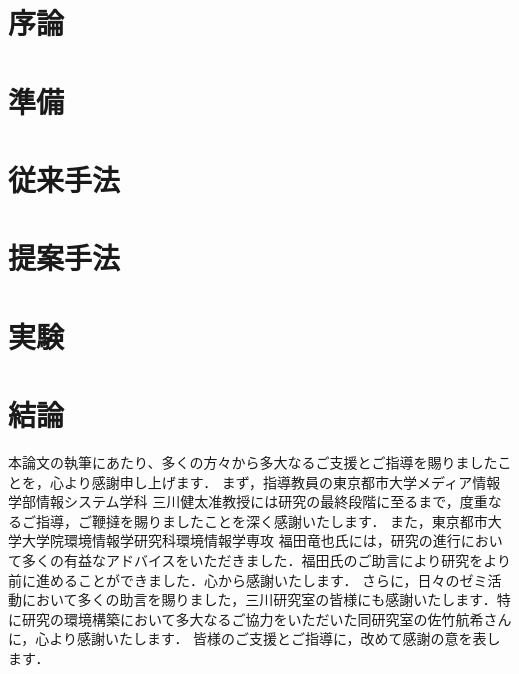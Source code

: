 \documentclass[12pt,uplatex]{jsarticle}   %
\begin{document}
\section{序論}


\section{準備}


\section{従来手法}


\section{提案手法}


\section{実験}


\section{結論}



\acknowledgements
本論文の執筆にあたり、多くの方々から多大なるご支援とご指導を賜りましたことを，心より感謝申し上げます．
まず，指導教員の東京都市大学メディア情報学部情報システム学科 三川健太准教授には研究の最終段階に至るまで，度重なるご指導，ご鞭撻を賜りましたことを深く感謝いたします．
また，東京都市大学大学院環境情報学研究科環境情報学専攻 福田竜也氏には，研究の進行において多くの有益なアドバイスをいただきました．福田氏のご助言により研究をより前に進めることができました．心から感謝いたします．
さらに，日々のゼミ活動において多くの助言を賜りました，三川研究室の皆様にも感謝いたします．特に研究の環境構築において多大なるご協力をいただいた同研究室の佐竹航希さんに，心より感謝いたします．
皆様のご支援とご指導に，改めて感謝の意を表します．



\appendix

\end{document}
